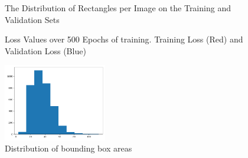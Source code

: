\documentclass{article}
\begin{document}
\begin{figure}
\centering
{}
\qquad
{}
\caption{The Distribution of Rectangles per Image on the Training and Validation Sets}
\label{fig:recdist}
\end{figure}

\begin{figure}
\centering
{}
\qquad
{}
\caption{Loss Values over 500 Epochs of training. Training Loss (Red) and Validation Loss (Blue)}
\label{fig:rgrasp_loss}
\end{figure}

\begin{figure}
\centering
\includegraphics[width=0.4\textwidth]{figures/bbox_area_dist_train.png}
\caption{Distribution of bounding box areas}
\label{fig:areas}
\end{figure}




\end{document}
